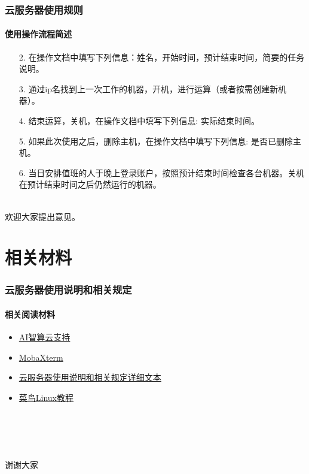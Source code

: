 \documentclass[10pt]{beamer}
\begin{document}
        \begin{frame}
            \frametitle{云服务器使用规则}
                \framesubtitle{使用操作流程简述}

                    \begin{itemize}
                        \item [2. ]{在操作文档中填写下列信息：姓名，开始时间，预计结束时间，简要的任务说明。}
                        \item [3. ]{通过ip名找到上一次工作的机器，开机，进行运算（或者按需创建新机器）。}
                        \item [4. ]{结束运算，关机，在操作文档中填写下列信息: 实际结束时间。}
                        \item [5. ]{如果此次使用之后，删除主机，在操作文档中填写下列信息: 是否已删除主机。}
                        \item [6. ]{当日安排值班的人于晚上登录账户，按照预计结束时间检查各台机器。关机在预计结束时间之后仍然运行的机器。}
                    \end{itemize}
                    \hspace*{\fill}\\
                    \centering
                    {\large 欢迎大家提出意见。}

        \end{frame}


    \section{相关材料}
        \begin{frame}
            \frametitle{云服务器使用说明和相关规定}
                \framesubtitle{相关阅读材料}
                \begin{itemize}
                    \item \href{https://ai.blsc.cn/\#/support/info}{AI智算云支持} \\
                    \item \href{https://mobaxterm.mobatek.net}{MobaXterm} \\
                    \item \href{https://github.com/Ls-Dai/Cloud-Sever-Tutorial}{云服务器使用说明和相关规定详细文本} \\
                    \item \href{https://www.runoob.com/linux/linux-tutorial.html}{菜鸟Linux教程} \\
                \end{itemize}
                \hspace*{\fill} \\
                \hspace*{\fill} \\
                \hspace*{\fill} \\
                \hspace*{\fill} \\
                \centering
                {\huge 谢谢大家}
        \end{frame}
\end{document}
